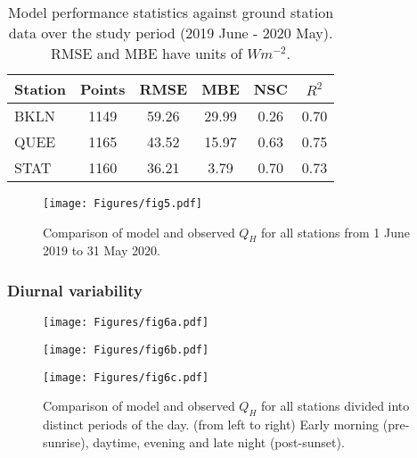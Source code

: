 \begin{table}[ht]
\centering
\caption{Model performance statistics against ground station data over the study period (2019 June - 2020 May). RMSE and MBE have units of $W m^{-2}$.}
    \begin{tabular}[t]{lccccc}
        \hline
        Station & Points & RMSE & MBE & NSC & $R^2$ \\
        \hline
        BKLN & 1149 & 59.26 & 29.99 & 0.26 & 0.70 \\
        QUEE & 1165 & 43.52 & 15.97 & 0.63 & 0.75 \\
        STAT & 1160 & 36.21 & 3.79 & 0.70 & 0.73 \\
        \hline
    \end{tabular}
    \label{tab:performance-stats}
\end{table}

\begin{figure}[ht!]
    \centering
        \texttt{[image: Figures/fig5.pdf]}
    \caption{Comparison of model and observed $Q_H$ for all stations from 1 June 2019 to 31 May 2020.}
    \label{fig:overall-scatter}
\end{figure}

\FloatBarrier

\subsubsection{Diurnal variability} \label{section:results-diurnal-variability}

\begin{figure}[!h]
    \centering
    \begin{minipage}{0.33\textwidth}
        \centering
        \texttt{[image: Figures/fig6a.pdf]}
    \end{minipage}\hfill
    \begin{minipage}{0.33\textwidth}
        \centering
        \texttt{[image: Figures/fig6b.pdf]}
    \end{minipage}\hfill
    \begin{minipage}{0.33\textwidth}
        \centering
        \texttt{[image: Figures/fig6c.pdf]}
    \end{minipage}\hfill
    \caption{Comparison of model and observed $Q_H$ for all stations divided into distinct periods of the day. (from left to right) Early morning (pre-sunrise), daytime, evening and late night (post-sunset).}
    \label{fig:diurnal-seasonal-scatter} 
\end{figure}

